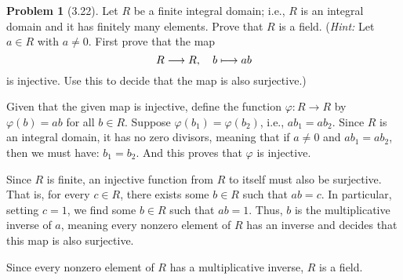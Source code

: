 \documentclass[12pt]{article}
\theoremstyle{definition}
\newtheorem{problem}{Problem}
\begin{document}
\begin{problem}[3.22]
    Let $R$ be a finite integral domain; i.e., $R$ is an integral domain and it has finitely many elements.
    Prove that $R$ is a field. (\textit{Hint:} Let $a \in R$ with $a \neq 0$. First prove that the map
    \[
        R \longrightarrow R, \hspace{10px} b \longmapsto ab
    \]
    is injective. Use this to decide that the map is also surjective.)

    \begin{solution}
        Given that the given map is injective, define the function $\varphi: R \to R$ by $\varphi(b) = ab$ 
        for all $b \in R$. Suppose $\varphi(b_1) = \varphi(b_2)$, i.e., $ab_1 = ab_2$.
        Since $R$ is an integral domain, it has no zero divisors, meaning that if $a \neq 0$ and $ab_1 = ab_2$, 
        then we must have: $b_1 = b_2$. And this proves that $\varphi$ is injective.
    
        Since $R$ is finite, an injective function from $R$ to itself must also be surjective. 
        That is, for every $c \in R$, there exists some $b \in R$ such that $ab = c$.
        In particular, setting $c = 1$, we find some $b \in R$ such that $ab = 1$.
        Thus, $b$ is the multiplicative inverse of $a$, meaning every nonzero element of $R$ has an inverse
        and decides that this map is also surjective.
    
        Since every nonzero element of $R$ has a multiplicative inverse, $R$ is a field.    
    \end{solution}
\end{problem}
\end{document}
